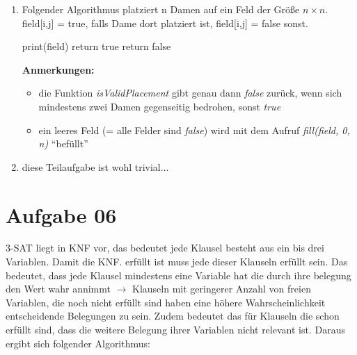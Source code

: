 \documentclass[10pt,a4paper]{article}
\begin{document}
    \begin{enumerate}[label={\alph*)}]
        \item
        Folgender Algorithmus platziert n Damen auf ein Feld der Größe $n \times n$.
        field[i,j] = true, falls Dame dort platziert ist, field[i,j] = false sonst. \\
        \begin{algorithm}[H]
         
             {
                 {
                    print(field) \;
                    return true \;
                }
                return false\;
            }
         
        \end{algorithm}
        
        \textbf{Anmerkungen: }
        \begin{itemize}
            \item die Funktion \textit{isValidPlacement} gibt genau dann \textit{false}
                zurück, wenn sich mindestens zwei Damen gegenseitig bedrohen,
                sonst \textit{true}
            \item ein leeres Feld (= alle Felder sind \textit{false}) wird mit dem 
                Aufruf \textit{fill(field, 0, n)} ``befüllt'' 
        \end{itemize}
        
         \item diese Teilaufgabe ist wohl trivial...

        
    \end{enumerate}


\section*{Aufgabe 06}
    3-SAT liegt in KNF vor, das bedeutet jede Klausel
    besteht aus ein bis drei Variablen. Damit die KNF.
    erfüllt ist muss jede dieser Klauseln erfüllt sein.
    Das bedeutet, dass jede Klausel mindestens eine Variable
    hat die durch ihre belegung den Wert wahr annimmt $\rightarrow$
    Klauseln mit geringerer Anzahl von freien Variablen, die
    noch nicht erfüllt sind haben eine höhere Wahrscheinlichkeit
    entscheidende Belegungen zu sein. Zudem bedeutet das für
    Klauseln die schon erfüllt sind, dass die weitere Belegung
    ihrer Variablen nicht relevant ist.
    Daraus ergibt sich folgender Algorithmus: \\
\end{document}
